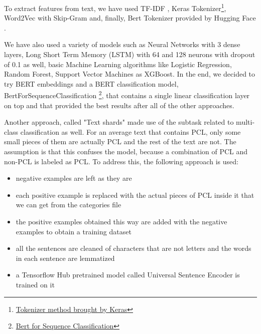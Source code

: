 \documentclass[11pt]{article}
\begin{document}
\begin{enumerate}
	      To extract features from text, we have used TF-IDF \cite{ref1}, Keras Tokenizer\footnote{\href{https://www.tensorflow.org/api_docs/python/tf/keras/preprocessing/text/Tokenizer}{Tokenizer method brought by Keras}}, Word2Vec with Skip-Gram \cite{mikolov2013word2vec} and, finally, Bert Tokenizer provided by Hugging Face \cite{huggingface}.

	      We have also used a variety of models such as Neural Networks with 3 dense layers, Long Short
	      Term Memory (LSTM) \cite{hichreichter} with 64 and 128 neurons with dropout of 0.1 as well, basic
	      Machine Learning algorithms like Logistic Regression, Random Forest, Support
	      Vector Machines as XGBoost. In the end, we decided to try BERT embeddings
	      and a BERT classification model, BertForSequenceClassification \footnote{\href{https://huggingface.co/docs/transformers/model_doc/bert\#transformers.BertForSequenceClassification}{Bert for Sequence Classification}}, that
	      contains a single linear classification layer on top and that provided the
	      best results after all of the other approaches.

	      Another approach, called "Text shards" made use of the subtask related to
	      multi-class classification as well. For an average text that contains PCL,
	      only some small pieces of them are actually PCL and the rest of the text are
	      not. The assumption is that this confuses the model, because a combination
	      of PCL and non-PCL is labeled as PCL. To address this, the following
	      approach is used:

	      \begin{itemize}
		      \item negative examples are left as they are

		      \item each positive example is replaced with the actual pieces of PCL inside
		            it that we can get from the categories file

		      \item the positive examples obtained this way are added with the negative
		            examples to obtain a training dataset

		      \item all the sentences are cleaned of characters that are not letters and
		            the words in each sentence are lemmatized

		      \item a Tensorflow Hub pretrained model called Universal Sentence Encoder \cite{USE} is
		            trained on it


\end{itemize}
\end{enumerate}
\end{document}
